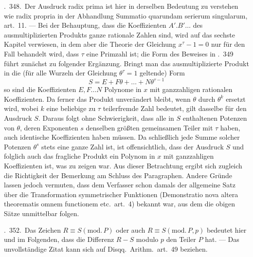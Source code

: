 \textsection.\ 348.\ Der Ausdruck radix prima ist hier in derselben Bedeutung zu verstehen wie radix propria in der Abhandlung Summatio quarundam serierum singularum, art.\ 11. --- Bei der Behauptung, dass die Koeffizienten $A'.B'\ldots$ des ausmultiplizierten Produkts ganze rationale Zahlen sind, wird auf das sechste Kapitel verwiesen, in dem aber die Theorie der Gleichung $x^\tau-1=0$ nur für den Fall behandelt wird, dass $\tau$ eine Primzahl ist; die Form des Beweises in \textsection.\ 349 führt zunächst zu folgender Ergänzung. Bringt man das ausmultiplizierte Produkt in die (für alle Wurzeln der Gleichung $\theta^\tau=1$ geltende) Form
\[
S=E+F\theta+\ldots+N\theta^{\tau-1}
\]
so sind die Koeffizienten $E,F\ldots N$ Polynome in $x$ mit ganzzahligen rationalen Koeffizienten. Da ferner das Produkt unverändert bleibt, wenn $\theta$ durch $\theta^k$ ersetzt wird, wobei $k$ eine beliebige zu $\tau$ teilerfremde Zahl bedeutet, gilt dasselbe für den Ausdruck $S$. Daraus folgt ohne Schwierigkeit, dass alle in $S$ enthaltenen Potenzen von $\theta$, deren Exponenten $s$ denselben größten gemeinsamen Teiler mit $\tau$ haben, auch identische Koeffizienten haben müssen. Da schließlich jede Summe solcher Potenzen $\theta^s$ stets eine ganze Zahl ist, ist offensichtlich, dass der Ausdruck $S$ und folglich auch das fragliche Produkt ein Polynom in $x$ mit ganzzahligen Koeffizienten ist, was zu zeigen war. Aus dieser Betrachtung ergibt sich zugleich die Richtigkeit der Bemerkung am Schluss des Paragraphen. Andere Gründe lassen jedoch vermuten, dass dem Verfasser schon damals der allgemeine Satz über die Transformation symmetrischer Funktionen (Demonstratio nova altera theorematis omnem functionem etc.\ art.\ 4) bekannt war, aus dem die obigen Sätze unmittelbar folgen.

\textsection.\ 352.\ Das Zeichen $R\equiv S(\mathrm{mod.}\,P)$ oder auch $R\equiv S(\mathrm{mod.}\,P,p)$ bedeutet hier und im
Folgenden, dass die Differenz $R-S$ modulo $p$ den Teiler $P$ hat. --- Das unvollständige Zitat kann sich auf Disqq.\ Arithm.\ art.\ 49 beziehen.


